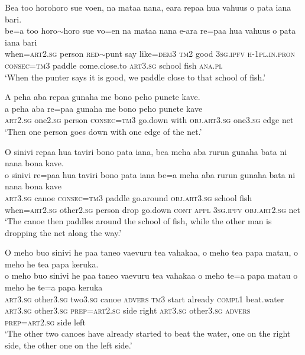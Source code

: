 \ea\label{ex:text23-9}
Bea too horohoro sue voen, na mataa nana, eara repaa hua vahuus o pata iana bari.\\
\gll be=a	too	horo{$\sim$}horo	sue	vo=en	na	mataa	nana	e-ara	re=paa	hua	vahuus	o	pata	iana	bari\\
     when=\textsc{art}2.\textsc{sg}	person	\textsc{red}{$\sim$}punt	say	like=\textsc{dem}3	\textsc{tm}2	good	3\textsc{sg}.\textsc{ipfv}	\textsc{h}-1\textsc{pl}.\textsc{in}.\textsc{pron}	\textsc{consec}=\textsc{tm}3	paddle	come.close.to	\textsc{art}3.\textsc{sg}	school	fish	\textsc{ana}.\textsc{pl}\\
\glt `When the punter says it is good, we paddle close to that school of fish.'
\z

\ea\label{ex:text23-10}
A peha aba repaa gunaha me bono peho punete kave.\\
\gll a	peha	aba	re=paa	gunaha	me	bono	peho	punete	kave\\
     \textsc{art}2.\textsc{sg}	one2.\textsc{sg}	person	\textsc{consec}=\textsc{tm}3	go.down	with	\textsc{obj}.\textsc{art}3.\textsc{sg}	one3.\textsc{sg}	edge	net\\
\glt `Then one person goes down with one edge of the net.'
\z

\ea\label{ex:text23-11}
O sinivi repaa hua taviri bono pata iana, bea meha aba rurun gunaha bata ni nana bona kave.\\
\gll o	sinivi	re=paa	hua	taviri	bono	pata	iana	be=a	meha	aba	rurun	gunaha	bata	ni	nana	bona	kave\\
     \textsc{art}3.\textsc{sg}	canoe	\textsc{consec}=\textsc{tm}3	paddle	go.around	\textsc{obj}.\textsc{art}3.\textsc{sg}	school	fish	when=\textsc{art}2.\textsc{sg}	other2.\textsc{sg}	person	drop	go.down	\textsc{cont}	\textsc{appl}	3\textsc{sg}.\textsc{ipfv}	\textsc{obj}.\textsc{art}2.\textsc{sg}	net\\
\glt `The canoe then paddles around the school of fish, while the other man is dropping the net along the way.'
\z

\ea\label{ex:text23-12}
O meho buo sinivi he paa taneo vaevuru tea vahakaa, o meho tea papa matau, o meho he tea papa keruka.\\
\gll o	meho	buo	sinivi	he	paa	taneo	vaevuru	tea	vahakaa	o	meho	te=a	papa	matau	o	meho	he	te=a	papa	keruka\\
     \textsc{art}3.\textsc{sg}	other3.\textsc{sg}	two3.\textsc{sg}	canoe	\textsc{advers}	\textsc{tm}3	start	already	\textsc{compl}1	beat.water	\textsc{art}3.\textsc{sg}	other3.\textsc{sg}	\textsc{prep}=\textsc{art}2.\textsc{sg}	side	right	\textsc{art}3.\textsc{sg}	other3.\textsc{sg}	\textsc{advers}	\textsc{prep}=\textsc{art}2.\textsc{sg}	side	left\\
\glt `The other two canoes have already started to beat the water, one on the right side, the other one on the left side.'
\z

